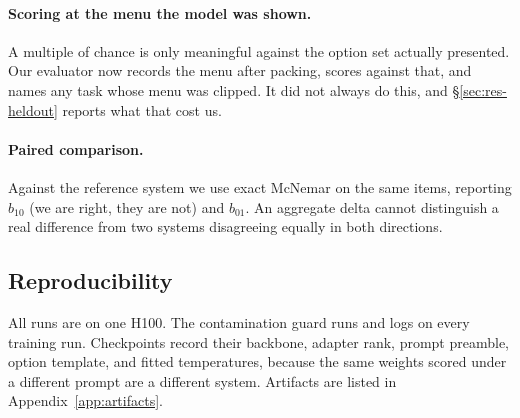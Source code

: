\paragraph{Scoring at the menu the model was shown.} A multiple of chance
is only meaningful against the option set actually presented. Our
evaluator now records the menu after packing, scores against that, and
names any task whose menu was clipped. It did not always do this, and
\S\ref{sec:res-heldout} reports what that cost us.

\paragraph{Paired comparison.} Against the reference system we use exact
McNemar on the same items, reporting $b_{10}$ (we are right, they are not)
and $b_{01}$. An aggregate delta cannot distinguish a real difference from
two systems disagreeing equally in both directions.

\subsection{Reproducibility}

All runs are on one H100. The contamination guard runs and logs on every
training run. Checkpoints record their backbone, adapter rank, prompt
preamble, option template, and fitted temperatures, because the same
weights scored under a different prompt are a different system. Artifacts
are listed in Appendix~\ref{app:artifacts}.
